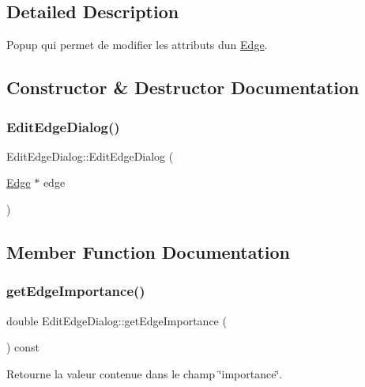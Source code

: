 \subsection{Detailed Description}
Popup qui permet de modifier les attributs d\textquotesingle{}un \mbox{\hyperlink{class_edge}{Edge}}. 

\subsection{Constructor \& Destructor Documentation}
\mbox{\label{class_edit_edge_dialog_a2c74f6de2329989a559918ebd60b31b0}} 
\subsubsection{\texorpdfstring{Edit\+Edge\+Dialog()}{EditEdgeDialog()}}
{\footnotesize\ttfamily Edit\+Edge\+Dialog\+::\+Edit\+Edge\+Dialog (\begin{DoxyParamCaption}\item[{\mbox{\hyperlink{class_edge}{Edge}} $\ast$}]{edge }\end{DoxyParamCaption})}



\subsection{Member Function Documentation}
\mbox{\label{class_edit_edge_dialog_a0a22d131d347363511e010557581f60b}} 
\subsubsection{\texorpdfstring{get\+Edge\+Importance()}{getEdgeImportance()}}
{\footnotesize\ttfamily double Edit\+Edge\+Dialog\+::get\+Edge\+Importance (\begin{DoxyParamCaption}{ }\end{DoxyParamCaption}) const}



Retourne la valeur contenue dans le champ \char`\"{}importance\char`\"{}. 

